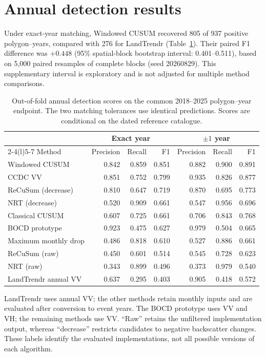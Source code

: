 \documentclass[11pt,a4paper]{article}
\begin{document}
\section{Annual detection results}
\label{sec:si_annual_results}
Under exact-year matching, Windowed CUSUM recovered 805 of 937 positive polygon--years, compared with 276 for LandTrendr (Table~\ref{tab:si_annual_scores}). Their paired F1 difference was $+0.448$ (95\% spatial-block bootstrap interval: 0.401--0.511), based on 5,000 paired resamples of complete blocks (seed 20260829). This supplementary interval is exploratory and is not adjusted for multiple method comparisons.

\begin{table}[!htbp]
\caption{Out-of-fold annual detection scores on the common 2018--2025 polygon--year endpoint. The two matching tolerances use identical predictions. Scores are conditional on the dated reference catalogue.}
\label{tab:si_annual_scores}
\centering\small
\setlength{\tabcolsep}{4pt}
\begin{tabular*}{\linewidth}{@{\extracolsep{\fill}}lrrrrrr@{}}
\toprule
& \multicolumn{3}{c}{Exact year} & \multicolumn{3}{c}{$\pm1$ year}\\
\cmidrule(lr){2-4}\cmidrule(l){5-7}
Method & Precision & Recall & F1 & Precision & Recall & F1\\
\midrule
Windowed CUSUM       & 0.842 & 0.859 & 0.851 & 0.882 & 0.900 & 0.891\\
CCDC VV              & 0.851 & 0.752 & 0.799 & 0.935 & 0.826 & 0.877\\
ReCuSum (decrease)   & 0.810 & 0.647 & 0.719 & 0.870 & 0.695 & 0.773\\
NRT (decrease)       & 0.520 & 0.909 & 0.661 & 0.547 & 0.956 & 0.696\\
Classical CUSUM      & 0.607 & 0.725 & 0.661 & 0.706 & 0.843 & 0.768\\
BOCD prototype      & 0.923 & 0.475 & 0.627 & 0.979 & 0.504 & 0.665\\
Maximum monthly drop & 0.486 & 0.818 & 0.610 & 0.527 & 0.886 & 0.661\\
ReCuSum (raw)        & 0.450 & 0.601 & 0.514 & 0.545 & 0.728 & 0.623\\
NRT (raw)            & 0.343 & 0.899 & 0.496 & 0.373 & 0.979 & 0.540\\
LandTrendr annual VV & 0.637 & 0.295 & 0.403 & 0.905 & 0.418 & 0.572\\
\bottomrule
\end{tabular*}
\par\smallskip
\raggedright\footnotesize
LandTrendr uses annual VV; the other methods retain monthly inputs and are evaluated after conversion to event years. The BOCD prototype uses VV and VH; the remaining methods use VV. ``Raw'' retains the unfiltered implementation output, whereas ``decrease'' restricts candidates to negative backscatter changes. These labels identify the evaluated implementations, not all possible versions of each algorithm.
\end{table}
\end{document}
